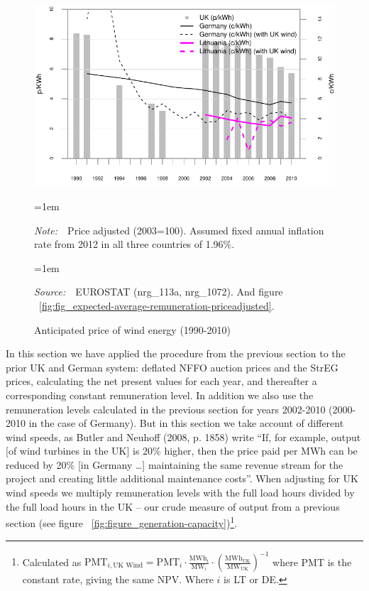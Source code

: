 \documentclass[a4paper, 12pt]{article}
\newcommand{\Figtext}[1]{%
	\begin{tablenotes}[para,flushleft]
		\hangindent=1em
		\footnotesize
		\raggedright
		#1
	\end{tablenotes}
}
\newcommand{\Fignote}[1]{\Figtext{\emph{Note:~}~#1}}
\newcommand{\Figsource}[1]{\Figtext{\emph{Source:~}~#1}}
\begin{document}
\begin{figure}
	\centering
	\caption{Anticipated price of wind energy (1990-2010)}
	\includegraphics[width=1\textwidth]{fig_anticipated-price-energy}
	\Fignote{Price adjusted (2003=100). Assumed fixed annual inflation rate from 2012 in all three countries of 1.96\%.}
	\Figsource{EUROSTAT (nrg\_113a, nrg\_1072). And figure ~\ref{fig:fig_expected-average-remuneration-priceadjusted}.}
	\label{fig:fig_anticipated-price-energy}
\end{figure}

In this section we have applied the procedure from the previous section to the prior UK and German system: deflated NFFO auction prices and the StrEG prices, calculating the net present values for each year, and thereafter a corresponding constant remuneration level. In addition we also use the remuneration levels calculated in the previous section for years 2002-2010 (2000-2010 in the case of Germany). But in this section we take account of different wind speeds, as Butler and Neuhoff (2008, p. 1858) write ``If, for example, output [of wind turbines in the UK] is 20\% higher, then the price paid per MWh can be reduced by 20\% [in Germany …] maintaining the same revenue stream for the project and creating little additional maintenance costs''. When adjusting for UK wind speeds we multiply remuneration levels with the full load hours divided by the full load hours in the UK – our crude measure of output from a previous section (see figure ~\ref{fig:figure_generation-capacity})\footnote{Calculated as $\text{PMT}_{i,\text{UK Wind}} = \text{PMT}_i \cdot \frac{\text{MWh}_i}{\text{MW}_i} \cdot \left(\frac{\text{MWh}_\text{UK}}{\text{MW}_\text{UK}}\right)^{-1}$ where PMT is the constant rate, giving the same NPV. Where $i$ is LT or DE.}.
\end{document}
